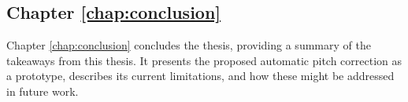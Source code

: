 \subsection{Chapter \ref{chap:conclusion}}
Chapter \ref{chap:conclusion} concludes the thesis, providing a summary of the takeaways from this thesis. It presents the proposed automatic pitch correction as a prototype, describes its current limitations, and how these might be addressed in future work.




